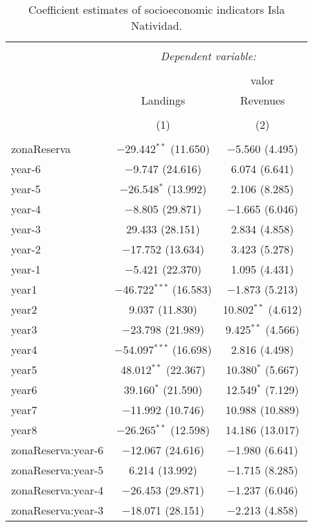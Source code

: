 \documentclass[utf8]{frontiers_suppmat} %
\theoremstyle{definition}
\theoremstyle{definition}
\theoremstyle{definition}
\theoremstyle{remark}
\begin{document}
\begin{table}[!htbp] \centering 
  \caption{Coefficient estimates of socioeconomic indicators Isla Natividad.} 
  \label{} 
\tiny 
\begin{tabular}{@{\extracolsep{1pt}}lcc} 
\\[-1.8ex]\hline 
\hline \\[-1.8ex] 
 & \multicolumn{2}{c}{\textit{Dependent variable:}} \\ 
\cline{2-3} 
\\[-1.8ex] &  & valor \\ 
 & Landings & Revenues \\ 
\\[-1.8ex] & (1) & (2)\\ 
\hline \\[-1.8ex] 
 zonaReserva & $-$29.442$^{**}$ (11.650) & $-$5.560 (4.495) \\ 
  year-6 & $-$9.747 (24.616) & 6.074 (6.641) \\ 
  year-5 & $-$26.548$^{*}$ (13.992) & 2.106 (8.285) \\ 
  year-4 & $-$8.805 (29.871) & $-$1.665 (6.046) \\ 
  year-3 & 29.433 (28.151) & 2.834 (4.858) \\ 
  year-2 & $-$17.752 (13.634) & 3.423 (5.278) \\ 
  year-1 & $-$5.421 (22.370) & 1.095 (4.431) \\ 
  year1 & $-$46.722$^{***}$ (16.583) & $-$1.873 (5.213) \\ 
  year2 & 9.037 (11.830) & 10.802$^{**}$ (4.612) \\ 
  year3 & $-$23.798 (21.989) & 9.425$^{**}$ (4.566) \\ 
  year4 & $-$54.097$^{***}$ (16.698) & 2.816 (4.498) \\ 
  year5 & 48.012$^{**}$ (22.367) & 10.380$^{*}$ (5.667) \\ 
  year6 & 39.160$^{*}$ (21.590) & 12.549$^{*}$ (7.129) \\ 
  year7 & $-$11.992 (10.746) & 10.988 (10.889) \\ 
  year8 & $-$26.265$^{**}$ (12.598) & 14.186 (13.017) \\ 
  zonaReserva:year-6 & $-$12.067 (24.616) & $-$1.980 (6.641) \\ 
  zonaReserva:year-5 & 6.214 (13.992) & $-$1.715 (8.285) \\ 
  zonaReserva:year-4 & $-$26.453 (29.871) & $-$1.237 (6.046) \\ 
  zonaReserva:year-3 & $-$18.071 (28.151) & $-$2.213 (4.858) \\ 

\end{tabular}
\end{table}
\end{document}
